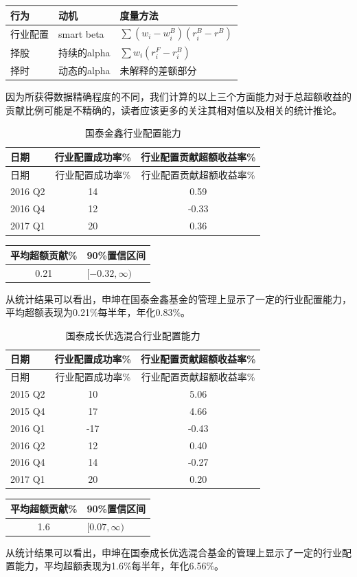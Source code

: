 \documentclass[hyperref,]{ctexart}
\begin{document}
\begin{longtable}[]{@{}lll@{}}
\toprule
行为 & 动机 & 度量方法\tabularnewline
\midrule
\endhead
行业配置 & smart beta & \(\sum(w_i-w_i^B)(r_i^B-r^B)\)\tabularnewline
择股 & 持续的alpha & \(\sum w_{i}(r_{i}^F-r_{i}^B)\)\tabularnewline
择时 & 动态的alpha & 未解释的差额部分\tabularnewline
\bottomrule
\end{longtable}

因为所获得数据精确程度的不同，我们计算的以上三个方面能力对于总超额收益的贡献比例可能是不精确的，读者应该更多的关注其相对值以及相关的统计推论。

\begin{longtable}[]{@{}lcc@{}}
\caption{国泰金鑫行业配置能力}\tabularnewline
\toprule
日期 & 行业配置成功率\% & 行业配置贡献超额收益率\%\tabularnewline
\midrule
\endfirsthead
\toprule
日期 & 行业配置成功率\% & 行业配置贡献超额收益率\%\tabularnewline
\midrule
\endhead
2016 Q2 & 14 & 0.59\tabularnewline
2016 Q4 & 12 & -0.33\tabularnewline
2017 Q1 & 20 & 0.36\tabularnewline
\bottomrule
\end{longtable}

\begin{longtable}[]{@{}cl@{}}
\toprule
平均超额贡献\% & 90\%置信区间\tabularnewline
\midrule
\endhead
0.21 & \([-0.32,\infty)\)\tabularnewline
\bottomrule
\end{longtable}

从统计结果可以看出，申坤在国泰金鑫基金的管理上显示了一定的行业配置能力，平均超额表现为0.21\%每半年，年化0.83\%。

\begin{longtable}[]{@{}lcc@{}}
\caption{国泰成长优选混合行业配置能力}\tabularnewline
\toprule
日期 & 行业配置成功率\% & 行业配置贡献超额收益率\%\tabularnewline
\midrule
\endfirsthead
\toprule
日期 & 行业配置成功率\% & 行业配置贡献超额收益率\%\tabularnewline
\midrule
\endhead
2015 Q2 & 10 & 5.06\tabularnewline
2015 Q4 & 17 & 4.66\tabularnewline
2016 Q1 & -17 & -0.43\tabularnewline
2016 Q2 & 12 & 0.40\tabularnewline
2016 Q4 & 14 & -0.27\tabularnewline
2017 Q1 & 20 & 0.20\tabularnewline
\bottomrule
\end{longtable}

\begin{longtable}[]{@{}cl@{}}
\toprule
平均超额贡献\% & 90\%置信区间\tabularnewline
\midrule
\endhead
1.6 & \([0.07,\infty)\)\tabularnewline
\bottomrule
\end{longtable}

从统计结果可以看出，申坤在国泰成长优选混合基金的管理上显示了一定的行业配置能力，平均超额表现为1.6\%每半年，年化6.56\%。
\end{document}
